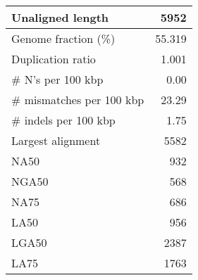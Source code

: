 \documentclass[12pt,a4paper]{article}
\begin{document}
\begin{table}[ht]
\begin{center}
\begin{tabular}{|l*{1}{|r}|}
Unaligned length & 5952 \\ \hline
Genome fraction (\%) & 55.319 \\ \hline
Duplication ratio & 1.001 \\ \hline
\# N's per 100 kbp & 0.00 \\ \hline
\# mismatches per 100 kbp & 23.29 \\ \hline
\# indels per 100 kbp & 1.75 \\ \hline
Largest alignment & 5582 \\ \hline
NA50 & 932 \\ \hline
NGA50 & 568 \\ \hline
NA75 & 686 \\ \hline
LA50 & 956 \\ \hline
LGA50 & 2387 \\ \hline
LA75 & 1763 \\ \hline
\end{tabular}
\end{center}
\end{table}
\end{document}
